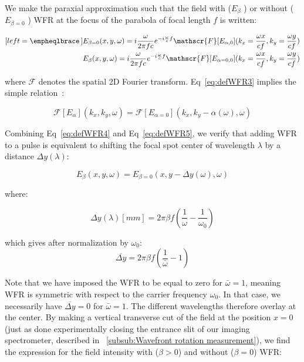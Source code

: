 \noindent We make the paraxial approximation such that the field with ($E_{\beta}$ ) or without ($E_{\beta=0}$ ) WFR at the focus of the parabola of focal length $f$ is written:

\begin{subequations}
\label{eq:defWFR4}
\begin{align}[left = \empheqlbrace\,]
     &E_{\beta=0}(x,y,\omega) = i\frac{\omega}{2 \pi f c}e^{-i\frac{\omega}{c}f}\mathscr{F}[E_{\alpha,0}](k_x = \frac{\omega x}{c f},k_y = \frac{\omega y}{c f}) \label{eq:eq:defWFR4-1}\\
     &E_{\beta}(x,y,\omega) = i\frac{\omega}{2 \pi f c}e^{-i\frac{\omega}{c}f}\mathscr{F}[E_{\alpha=0,0}](k_x = \frac{\omega x}{c f},k_y = \frac{\omega y}{c f})\label{eq:eq:defWFR4-2}
\end{align}
\end{subequations}



\noindent where $\mathscr{F}$ denotes the spatial 2D Fourier transform. Eq~\ref{eq:defWFR3} implies the simple relation~\cite{wefers1996space}:

\begin{equation}
\label{eq:defWFR5}
\mathscr{F}[E_{\alpha}](k_x,k_y,\omega)= \mathscr{F}[E_{\alpha=0}](k_x,k_y-\alpha(\omega),\omega)
\end{equation}

\noindent Combining Eq~\ref{eq:defWFR4} and Eq~\ref{eq:defWFR5}, we verify that adding WFR to a pulse is equivalent to shifting the focal spot center of wavelength $\lambda$ by a distance $\Delta y (\lambda)$:

\begin{equation}
E_{\beta}(x,y,\omega) = E_{\beta=0}(x,y-\Delta y (\omega),\omega)
\end{equation}

\noindent where:

 $$
\Delta y (\lambda)[mm] = 2\pi \beta f(\frac{1}{\omega}-\frac{1}{\omega_0})
$$

\noindent which gives after normalization by $\omega_0$:
$$
\overline{\Delta {y}} =  2\pi \beta  f (\frac{1}{\bar{\omega}}-1)
$$

\noindent Note that we have imposed the WFR to be equal to zero for $\bar{\omega} = 1$, meaning WFR is symmetric with respect to the carrier frequency $\omega_0$. 
In that case, we necessarily have $\overline{\Delta {y}} = 0$ for $\bar{\omega} = 1$. The different wavelengths therefore overlay at the center. By making a vertical transverse cut of the field at the position  $x = 0$ (just as done experimentally closing the entrance slit of our imaging spectrometer, described in ~\ref{subsub:Wavefront rotation measurement}), we find the expression for the field intensity
with ($\beta>0$) and without ($\beta=0$) WFR: 

